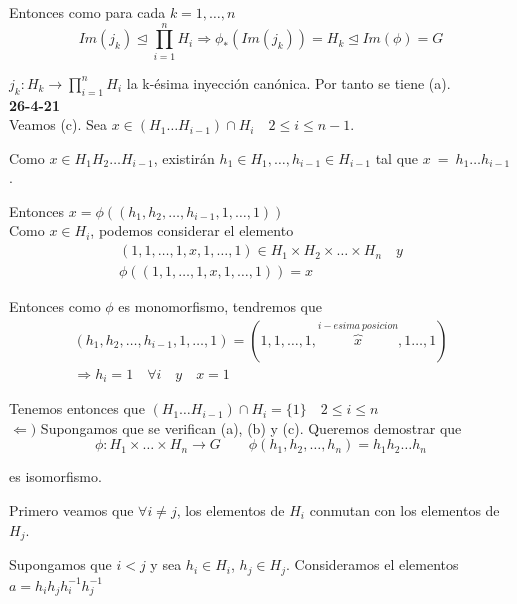 \documentclass{article}
\begin{document}
Entonces como para cada $k=1,\ldots,n$
\begin{equation*}
Im(j_k)\unlhd \prod_{i=1}^n H_i\Rightarrow \phi_*(Im(j_k))=H_k\unlhd Im(\phi)=G
\end{equation*}

$j_k:H_k\longrightarrow \prod_{i=1}^n H_i$ la k-ésima inyección canónica. Por tanto se tiene (a). \\

\textbf{26-4-21} \\

Veamos (c). Sea $x\in (H_1\ldots H_{i-1})\cap H_i\quad 2\leq i\leq n-1$.

Como $x\in H_1H_2\ldots H_{i-1}$, existirán $h_1\in H_1,\ldots,h_{i-1}\in H_{i-1}$ tal que $x~=~h_1\ldots h_{i-1}$. 

Entonces $x=\phi((h_1,h_2,\ldots,h_{i-1},1,\ldots,1))$ \\

Como $x\in H_i$, podemos considerar el elemento
\begin{gather*}
(1,1,\ldots,1,x,1,\ldots,1)\in H_1\times H_2\times \ldots \times H_n \quad y\\
\phi((1,1,\ldots,1,x,1,\ldots,1))=x
\end{gather*}

Entonces como $\phi$ es monomorfismo, tendremos que 
\begin{gather*}
(h_1,h_2,\ldots,h_{i-1},1,\ldots,1)=(1,1,\ldots,1,\overbrace{x}^{i-esima\:posicion},1\ldots,1) \\
\Rightarrow h_i=1\quad \forall i \quad y \quad x=1
\end{gather*}

Tenemos entonces que $(H_1\ldots H_{i-1})\cap H_i=\{1\} \quad 2\leq i \leq n$ \\

$\Leftarrow)$ Supongamos que se verifican (a), (b) y (c). Queremos demostrar que
\begin{equation*}
\phi:H_1\times \ldots\times H_n\longrightarrow G\qquad \phi(h_1,h_2,\ldots,h_n)=h_1h_2\ldots h_n
\end{equation*}

es isomorfismo.

Primero veamos que $\forall i \neq j$, los elementos de $H_i$ conmutan con los elementos de $H_j$. 

Supongamos que $i<j$ y sea $h_i\in H_i$, $h_j\in H_j$. Consideramos el elementos $a=h_ih_jh_i^{-1}h_j^{-1}$ \\
\end{document}
